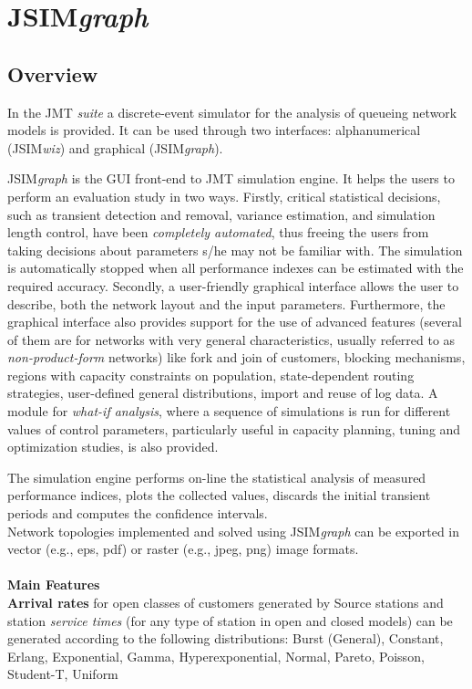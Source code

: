 \chapter{JSIM\emph{graph}}
\label{cha:jsimgraph}
\section{Overview}
In the JMT \emph{suite} a discrete-event simulator for the
analysis of queueing network models is provided. It can be used
through two interfaces: alphanumerical (JSIM\emph{wiz}) and
graphical (JSIM\emph{graph}).

JSIM\emph{graph} is the GUI front-end to JMT simulation engine. It
helps the users to perform an evaluation study in two ways.
Firstly, critical statistical decisions, such as transient
detection and removal, variance estimation, and simulation length
control, have been \emph{completely automated}, thus freeing the
users from taking decisions about parameters s/he may not be
familiar with. The simulation is automatically stopped when all
performance indexes can be estimated with the required accuracy.
Secondly, a user-friendly graphical interface allows the user to
describe, both the network layout and the input parameters.
Furthermore, the graphical interface also provides support for the
use of advanced features (several of them are for networks with
very general characteristics, usually referred to as
\emph{non-product-form} networks) like fork and join of customers,
blocking mechanisms, regions with capacity constraints on
population, state-dependent routing strategies, user-defined
general distributions, import and reuse of log data. A module for
\emph{what-if analysis}, where a sequence of simulations is run
for different values of control parameters, particularly useful in
capacity planning, tuning and optimization studies, is also
provided.

The simulation engine performs on-line the statistical analysis of
measured performance indices, plots the collected values, discards
the initial
transient periods and computes the confidence intervals.\\
Network topologies implemented and solved using JSIM\emph{graph}
can be exported in vector (e.g., eps, pdf) or raster (e.g., jpeg,
png) image formats.\\

\ \\
\noindent \textbf{\large Main Features}\\
\noindent \textbf{Arrival rates} for open classes of customers
generated by Source stations and station \emph{service times} (for
any type of station in open and closed models) can be generated
according to the following distributions: Burst (General),
Constant, Erlang, Exponential, Gamma, Hyperexponential, Normal,
Pareto, Poisson,
Student-T, Uniform \\

